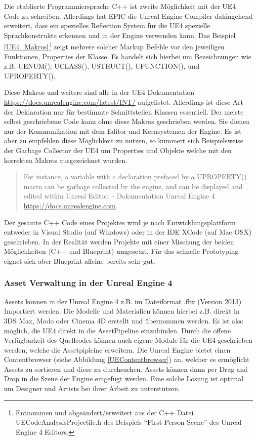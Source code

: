 \documentclass[pagesize, paper=a4, fontsize=12pt, titlepage=true, headings=small, headnosepline, abstractoff, liststotoc, nochapterprefix, plainheadsepline, twoside]{scrreprt}
\begin{document}
Die etablierte Programmiersprache C++ ist zweite Möglichkeit mit der UE4 Code zu schreiben. Allerdings hat EPIC die Unreal Engine Compiler dahingehend erweitert, dass ein spezielles Reflection System für die UE4 spezielle Sprachkonstrukte erkennen und in der Engine verwenden kann. Das Beispiel \ref{UE4_Makros}\footnote{Entnommen und abgeändert/erweitert aus der C++ Datei UECodeAnalysisProjectile.h des Beispiels “First Person Scene” des Unreal Engine 4 Editors.} zeigt mehrere solcher Markup Befehle vor den jeweiligen Funktionen, Properties der Klasse. Es handelt sich hierbei um Bezeichnungen wie z.B. UENUM(), UCLASS(), USTRUCT(), UFUNCTION(), und UPROPERTY().



Diese Makros und weitere sind alle in der UE4 Dokumentation \url{https://docs.unrealengine.com/latest/INT/} aufgelistet. Allerdings ist diese Art der Deklaration nur für bestimmte Schnittstellen Klassen essentiell. Der meiste selbst geschriebene Code kann ohne diese Makros geschrieben werden. Sie dienen nur der Kommunikation mit dem Editor und Kernsystemen der Engine. Es ist aber zu empfehlen diese Möglichkeit zu nutzen, so kümmert sich Beispielsweise der Garbage Collector der UE4 um Properties und Objekte welche mit den korrekten Makros ausgezeichnet wurden. 
\begin{quote}
For instance, a variable with a declaration prefaced by a UPROPERTY() macro can be garbage collected by the engine, and can be displayed and edited within Unreal Editor. \autocite{UnrealEngine4} - Dokumentation Unreal Engine 4 \url{https://docs.unrealengine.com}.
\end{quote}
Der gesamte C++ Code eines Projektes wird je nach Entwicklungsplattform entweder in Visual Studio (auf Windows) oder in der IDE XCode (auf Mac OSX) geschrieben. In der Realität werden Projekte mit einer Mischung der beiden Möglichkeiten (C++ und Blueprint) umgesetzt. Für das schnelle Prototyping eignet sich aber Blueprint alleine bereits sehr gut.

\subsubsection{Asset Verwaltung in der Unreal Engine 4}
Assets können in der Unreal Engine 4  z.B. im Dateiformat .fbx (Version 2013) Importiert werden. Die Modelle und Materialien können hierbei z.B. direkt in 3DS Max, Modo oder Cinema 4D erstellt und übernommen werden. Es ist also möglich, die UE4 direkt in die AssetPipeline einzubinden. Durch die offene Verfügbarkeit des Quellcodes können auch eigene Module für die UE4 geschrieben werden, welche die Assetpipleine erweitern. Die Unreal Engine bietet einen Contentbrowser (siehe Abbildung \ref{UEContentbrowser}) an, welcher es ermöglicht Assets zu sortieren und diese zu durchsuchen. Assets können dann per Drag and Drop in die Szene der Engine eingefügt werden. Eine solche Lösung ist optimal um Designer und Artists bei ihrer Arbeit zu unterstützen.
\end{document}
